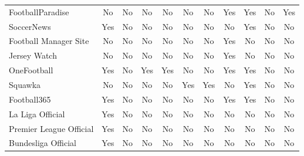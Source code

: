 \begin{table}[h!]
\begin{tabularx}{\textwidth}{|l|c|c|c|c|c|c|c|c|c|c|}
FootballParadise      & No                     & No                  & No              & No                   & No                    & No                    & Yes                & Yes                 & No                  & Yes                  \\
SoccerNews            & Yes                    & No                  & No              & No                   & No                    & No                    & No                 & Yes                 & No                  & No                   \\
Football Manager Site & No                     & No                  & No              & No                   & No                    & No                    & Yes                & No                  & No                  & No                   \\
Jersey Watch          & No                     & No                  & No              & No                   & No                    & No                    & Yes                & No                  & No                  & No                   \\
OneFootball           & Yes                    & No                  & Yes             & Yes                  & No                    & No                    & Yes                & Yes                 & No                  & No                   \\
Squawka               & No                     & No                  & No              & No                   & Yes                   & Yes                   & No                 & Yes                 & No                  & No                   \\
Football365           & Yes                    & No                  & No              & No                   & No                    & No                    & Yes                & Yes                 & No                  & No                   \\
La Liga Official      & Yes                    & No                  & No              & No                   & No                    & No                    & No                 & No                  & No                  & No                   \\
Premier League Official & Yes                  & No                  & No              & No                   & No                    & No                    & No                 & No                  & No                  & No                   \\
Bundesliga Official   & Yes                    & No                  & No              & No                   & No                    & No                    & No                 & No                  & No                  & No                   \\
\hline
\end{tabularx}
\end{table}
